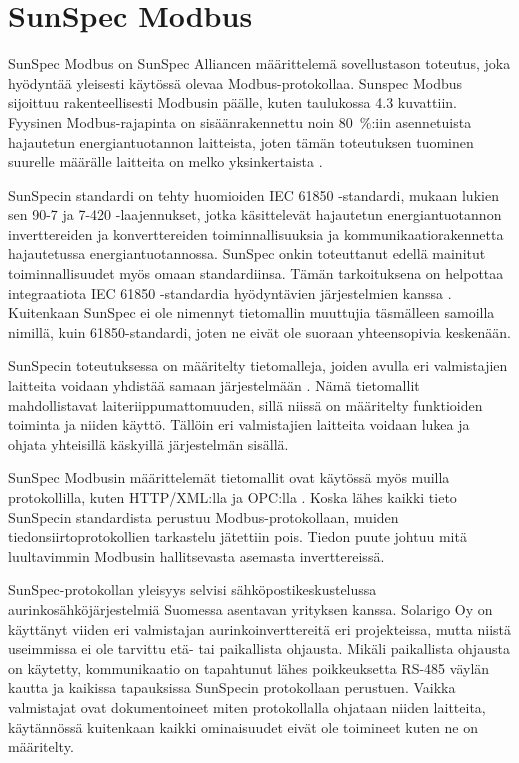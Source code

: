 \section{SunSpec Modbus}
  SunSpec Modbus on SunSpec Alliancen määrittelemä sovellustason toteutus, joka hyödyntää yleisesti käytössä olevaa Modbus-protokollaa. Sunspec Modbus sijoittuu rakenteellisesti Modbusin päälle, kuten taulukossa 4.3 kuvattiin. Fyysinen Modbus-rajapinta on sisäänrakennettu noin \SI{80}{\percent}:iin asennetuista hajautetun energiantuotannon laitteista, joten tämän toteutuksen tuominen suurelle määrälle laitteita on melko yksinkertaista \parencite{SSFactSheet}.

  SunSpecin standardi on tehty huomioiden \gls{IEC} 61850 -standardi, mukaan lukien sen 90-7 ja 7-420 -laajennukset, jotka käsittelevät hajautetun energiantuotannon inverttereiden ja konverttereiden toiminnallisuuksia ja kommunikaatiorakennetta hajautetussa energiantuotannossa. SunSpec onkin toteuttanut edellä mainitut toiminnallisuudet myös omaan standardiinsa. Tämän tarkoituksena on helpottaa integraatiota \gls{IEC} 61850 -standardia hyödyntävien järjestelmien kanssa \parencite{SSTech}. Kuitenkaan SunSpec ei ole nimennyt tietomallin muuttujia täsmälleen samoilla nimillä, kuin 61850-standardi, joten ne eivät ole suoraan yhteensopivia keskenään.

  SunSpecin toteutuksessa on määritelty tietomalleja, joiden avulla eri valmistajien laitteita voidaan yhdistää samaan järjestelmään \parencite{SSTech}. Nämä tietomallit mahdollistavat laiteriippumattomuuden, sillä niissä on määritelty funktioiden toiminta ja niiden käyttö. Tällöin eri valmistajien laitteita voidaan lukea ja ohjata yhteisillä käskyillä järjestelmän sisällä.

  SunSpec Modbusin määrittelemät tietomallit ovat käytössä myös muilla protokollilla, kuten \gls{HTTP}/\gls{XML}:lla ja \gls{OPC}:lla \parencite{SSTech}. Koska lähes kaikki tieto SunSpecin standardista perustuu Modbus-protokollaan, muiden tiedonsiirtoprotokollien tarkastelu jätettiin pois. Tiedon puute johtuu mitä luultavimmin Modbusin hallitsevasta asemasta inverttereissä.

  SunSpec-protokollan yleisyys selvisi sähköpostikeskustelussa aurinkosähköjärjestelmiä Suomessa asentavan yrityksen kanssa. Solarigo Oy on käyttänyt viiden eri valmistajan aurinkoinverttereitä eri projekteissa, mutta niistä useimmissa ei ole tarvittu etä- tai paikallista ohjausta. Mikäli paikallista ohjausta on käytetty, kommunikaatio on tapahtunut lähes poikkeuksetta RS-485 väylän kautta ja kaikissa tapauksissa SunSpecin protokollaan perustuen. Vaikka valmistajat ovat dokumentoineet miten protokollalla ohjataan niiden laitteita, käytännössä kuitenkaan kaikki ominaisuudet eivät ole toimineet kuten ne on määritelty. \parencite{Solarigo}


